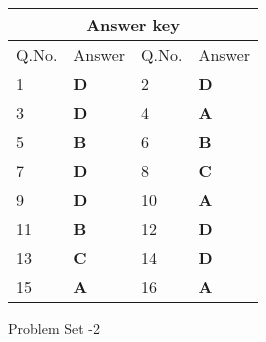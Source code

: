 \setlength\arrayrulewidth{1pt}
\begin{table}[H]
	\centering
	\begin{tabular}{|p{1.5cm}|p{1.5cm}||p{1.5cm}|p{1.5cm}|}
		\hline
		\multicolumn{4}{|c|}{\textbf{Answer key}}\\\hline\hline
		\rowcolor{ocrel}Q.No.&Answer&Q.No.&Answer\\\hline
		1&\textbf{D} &2&\textbf{D}\\\hline 
		3&\textbf{D} &4&\textbf{A} \\\hline
		5&\textbf{B} &6&\textbf{B} \\\hline
		7&\textbf{D}&8&\textbf{C}\\\hline
		9&\textbf{D}&10&\textbf{A}\\\hline
		11&\textbf{B} &12&\textbf{D}\\\hline
		13&\textbf{C}&14&\textbf{D}\\\hline
		15&\textbf{A}&16&\textbf{A} \\\hline
		
	\end{tabular}
\end{table}
\newpage
\begin{abox}
	Problem Set -2
\end{abox}

